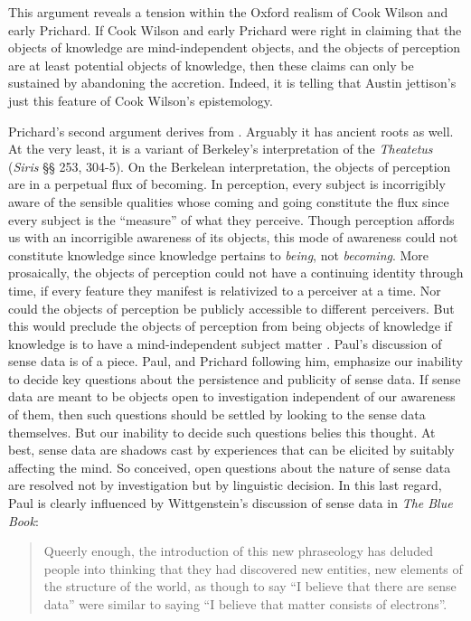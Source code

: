 This argument reveals a tension within the Oxford realism of Cook Wilson and early Prichard. If Cook Wilson and early Prichard were right in claiming that the objects of knowledge are mind-independent objects, and the objects of perception are at least potential objects of knowledge, then these claims can only be sustained by abandoning the accretion. Indeed, it is telling that Austin jettison's just this feature of Cook Wilson's epistemology.

Prichard's second argument derives from \citet{Paul:1936kd}. Arguably it has ancient roots as well. At the very least, it is a variant of Berkeley's interpretation of the \emph{Theatetus} (\emph{Siris} §§ 253, 304-5). On the Berkelean interpretation, the objects of perception are in a perpetual flux of becoming. In perception, every subject is incorrigibly aware of the sensible qualities whose coming and going constitute the flux since every subject is the ``measure'' of what they perceive. Though perception affords us with an incorrigible awareness of its objects, this mode of awareness could not constitute knowledge since knowledge pertains to \emph{being}, not \emph{becoming}. More prosaically, the objects of perception could not have a continuing identity through time, if every feature they manifest is relativized to a perceiver at a time. Nor could the objects of perception be publicly accessible to different perceivers. But this would preclude the objects of perception from being objects of knowledge if knowledge is to have a mind-independent subject matter \citep[see][for further discussion of the Berkelean interpretation]{Burnyeat:1990dp}. Paul's discussion of sense data is of a piece. Paul, and Prichard following him, emphasize our inability to decide key questions about the persistence and publicity of sense data. If sense data are meant to be objects open to investigation independent of our awareness of them, then such questions should be settled by looking to the sense data themselves. But our inability to decide such questions belies this thought. At best, sense data are shadows cast by experiences that can be elicited by suitably affecting the mind. So conceived, open questions about the nature of sense data are resolved not by investigation but by linguistic decision. In this last regard, Paul is clearly influenced by Wittgenstein's discussion of sense data in \emph{The Blue Book}:
\begin{quote}
    Queerly enough, the introduction of this new phraseology has deluded people into thinking that they had discovered new entities, new elements of the structure of the world, as though to say “I believe that there are sense data” were similar to saying “I believe that matter consists of electrons”. \citep[70]{Wittgenstein:1958rr}
\end{quote}

